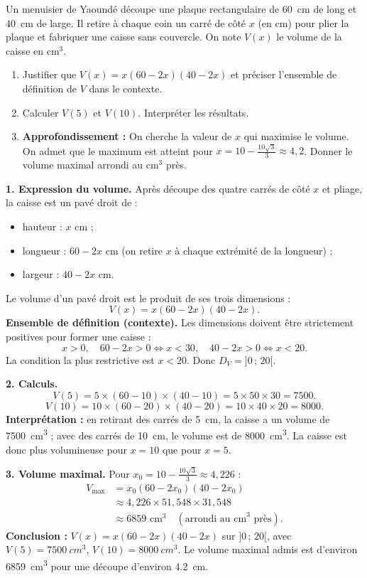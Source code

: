 \documentclass[11pt]{article}
\begin{document}
\begin{exoresolu}
Un menuisier de Yaoundé découpe une plaque rectangulaire de \SI{60}{cm} de long et \SI{40}{cm} de large. Il retire à chaque coin un carré de côté $x$ (en cm) pour plier la plaque et fabriquer une caisse sans couvercle. On note $V(x)$ le volume de la caisse en cm$^3$.
\begin{enumerate}
\item Justifier que $V(x) = x(60 - 2x)(40 - 2x)$ et préciser l'ensemble de définition de $V$ dans le contexte.
\item Calculer $V(5)$ et $V(10)$. Interpréter les résultats.
\item \textbf{Approfondissement :} On cherche la valeur de $x$ qui maximise le volume. On admet que le maximum est atteint pour $x = 10 - \frac{10\sqrt{3}}{3} \approx 4,2$. Donner le volume maximal arrondi au cm$^3$ près.
\end{enumerate}
\tcblower
\textbf{1. Expression du volume.} Après découpe des quatre carrés de côté $x$ et pliage, la caisse est un pavé droit de :
\begin{itemize}
\item hauteur : $x$ cm ;
\item longueur : $60 - 2x$ cm (on retire $x$ à chaque extrémité de la longueur) ;
\item largeur : $40 - 2x$ cm.
\end{itemize}
Le volume d'un pavé droit est le produit de ses trois dimensions :
\[ V(x) = x(60 - 2x)(40 - 2x). \]
\textbf{Ensemble de définition (contexte).} Les dimensions doivent être strictement positives pour former une caisse :
\[ x > 0, \quad 60 - 2x > 0 \Leftrightarrow x < 30, \quad 40 - 2x > 0 \Leftrightarrow x < 20. \]
La condition la plus restrictive est $x < 20$. Donc $D_V = ]0\,;\,20[$.

\textbf{2. Calculs.}
\[ V(5) = 5 \times (60 - 10) \times (40 - 10) = 5 \times 50 \times 30 = \num{7500}. \]
\[ V(10) = 10 \times (60 - 20) \times (40 - 20) = 10 \times 40 \times 20 = \num{8000}. \]
\textbf{Interprétation :} en retirant des carrés de \SI{5}{cm}, la caisse a un volume de \SI{7500}{cm^3} ; avec des carrés de \SI{10}{cm}, le volume est de \SI{8000}{cm^3}. La caisse est donc plus volumineuse pour $x = 10$ que pour $x = 5$.

\textbf{3. Volume maximal.} Pour $x_0 = 10 - \frac{10\sqrt{3}}{3} \approx 4,226$ :
\begin{align*}
V_{\text{max}} &= x_0(60-2x_0)(40-2x_0) \\
&\approx 4,226 \times 51,548 \times 31,548 \\
&\approx \num{6859} \text{ cm}^3 \quad (\text{arrondi au cm}^3 \text{ près}).
\end{align*}
\textbf{Conclusion :} $V(x) = x(60-2x)(40-2x)$ sur $]0\,;\,20[$, avec $V(5) = \SI{7500}{cm^3}$, $V(10) = \SI{8000}{cm^3}$. Le volume maximal admis est d'environ \SI{6859}{cm^3} pour une découpe d'environ \SI{4,2}{cm}.
\end{exoresolu}
\end{document}
